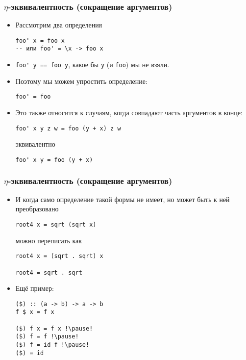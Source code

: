 \documentclass[10pt]{beamer}
\begin{document}
\begin{frame}[fragile]
\frametitle{$\eta$-эквивалентность (сокращение аргументов)}
\begin{itemize}
    \item Рассмотрим два определения
\begin{lstlisting}
foo' x = foo x
-- или foo' = \x -> foo x 
\end{lstlisting}
    \item \lstinline|foo' y == foo y|, какое бы \lstinline|y| (и \lstinline|foo|) мы не взяли.\pause
    \item Поэтому мы можем упростить определение:
\begin{lstlisting}
foo' = foo
\end{lstlisting}\pause
    \item Это также относится к случаям, когда совпадают часть аргументов в конце:
\begin{lstlisting}
foo' x y z w = foo (y + x) z w
\end{lstlisting}
эквивалентно
\begin{lstlisting}
foo' x y = foo (y + x)
\end{lstlisting}
\end{itemize}
\end{frame}

\begin{frame}[fragile]
\frametitle{$\eta$-эквивалентность (сокращение аргументов)}
\begin{itemize}
    \item И когда само определение такой формы не имеет, но может быть к ней преобразовано
\begin{lstlisting}
root4 x = sqrt (sqrt x)
\end{lstlisting}
можно переписать как
\begin{lstlisting}
root4 x = (sqrt . sqrt) x

root4 = sqrt . sqrt
\end{lstlisting}
    \item Ещё пример:
\begin{lstlisting}
($) :: (a -> b) -> a -> b
f $ x = f x

($) f x = f x !\pause!
($) f = f !\pause!
($) f = id f !\pause!
($) = id
\end{lstlisting}
\end{itemize}
\end{frame}
\end{document}
